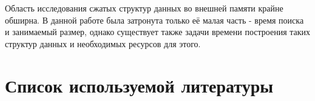 \documentclass[a4paper,12pt]{article}
\begin{document}
Область исследования сжатых структур данных во внешней памяти крайне обширна. В данной работе была затронута только её малая часть - время поиска и занимаемый размер, однако существует также задачи времени построения таких структур данных и необходимых ресурсов для этого.

\newpage
\section{Список используемой литературы}
\end{document}
